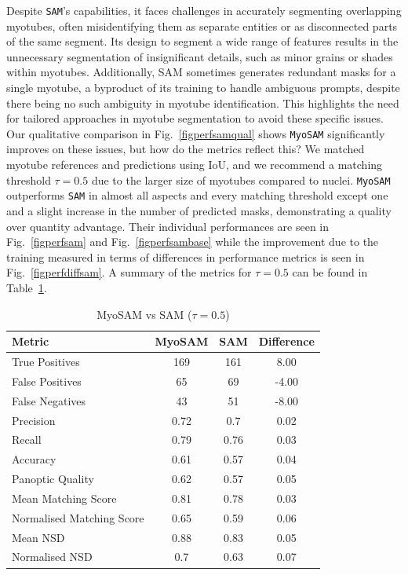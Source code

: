 Despite \texttt{SAM}'s capabilities, it faces challenges in accurately segmenting overlapping myotubes, often misidentifying them as separate entities or as disconnected parts of the same segment. Its design to segment a wide range of features results in the unnecessary segmentation of insignificant details, such as minor grains or shades within myotubes. Additionally, SAM sometimes generates redundant masks for a single myotube, a byproduct of its training to handle ambiguous prompts, despite there being no such ambiguity in myotube identification. This highlights the need for tailored approaches in myotube segmentation to avoid these specific issues. Our qualitative comparison in Fig.~\ref{figperfsamqual} shows \texttt{MyoSAM} significantly improves on these issues, but how do the metrics reflect this? We matched myotube references and predictions using IoU, and we recommend a matching threshold $\tau = 0.5$ due to the larger size of myotubes compared to nuclei. \texttt{MyoSAM} outperforms \texttt{SAM} in almost all aspects and every matching threshold except one and a slight increase in the number of predicted masks, demonstrating a quality over quantity advantage. Their individual performances are seen in Fig.~\ref{figperfsam} and Fig.~\ref{figperfsambase} while the improvement due to the training measured in terms of differences in performance metrics is seen in Fig.~\ref{figperfdiffsam}. A summary of the metrics for $\tau = 0.5$ can be found in Table~\ref{tabmyosamvssam}.
\begin{table}[H]
	\centering
	\caption{MyoSAM vs SAM ($\tau = 0.5$)}
	\label{tabmyosamvssam}
	\begin{tabular}{|l|c|c|c|}
		\hline
		Metric & MyoSAM & SAM & Difference \\
		\hline
		True Positives & 169 & 161 & 8.00 \\
		\hline
		False Positives & 65 & 69 & -4.00 \\
		\hline
		False Negatives & 43 & 51 & -8.00 \\
		\hline
		Precision & 0.72 & 0.7 & 0.02 \\
		\hline
		Recall & 0.79 & 0.76 & 0.03 \\
		\hline
		Accuracy & 0.61 & 0.57 & 0.04 \\
		\hline
		Panoptic Quality & 0.62 & 0.57 & 0.05 \\
		\hline
		Mean Matching Score & 0.81 & 0.78 & 0.03 \\
		\hline
		Normalised Matching Score & 0.65 & 0.59 & 0.06 \\
		\hline
		Mean NSD & 0.88 & 0.83 & 0.05 \\
		\hline
		Normalised NSD & 0.7 & 0.63 & 0.07 \\
		\hline
	\end{tabular}
\end{table}
